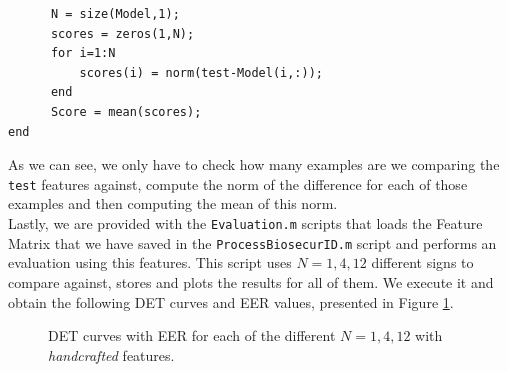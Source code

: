 \documentclass[a4paper]{article}
\def\inline{\lstinline[basicstyle=\ttfamily,keywordstyle={}]}
\begin{document}
{\begin{verbatim}
      N = size(Model,1);
      scores = zeros(1,N);
      for i=1:N
          scores(i) = norm(test-Model(i,:));
      end
      Score = mean(scores);
end
\end{verbatim}

As we can see, we only have to check how many examples are we comparing the \inline{test} features against, compute the norm of the difference for each of those examples and then computing the mean of this norm.\\

Lastly, we are provided with the \inline{Evaluation.m} scripts that loads the Feature Matrix that we have saved in the \inline{ProcessBiosecurID.m} script and performs an evaluation using this features. This script uses \(N = 1,4,12\) different signs to compare against, stores and plots the results for all of them. We execute it and obtain the following DET curves and EER values, presented in Figure \ref{fig:HAND}.

\begin{figure}[H]
  \centering
  \qquad
  \qquad%
  \caption{DET curves with EER for each of the different \(N = 1,4,12\) with \emph{handcrafted} features.}
  \label{fig:HAND}
\end{figure}

}
\end{document}
